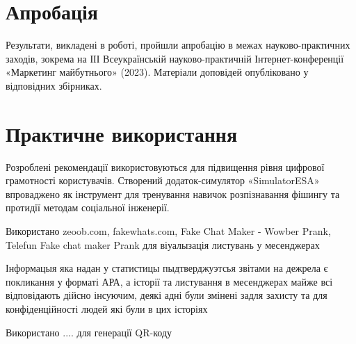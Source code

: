 ﻿\thispagestyle{empty}
\mbox{}

\vspace{1em}

\section*{Апробація}
Результати, викладені в роботі, пройшли апробацію в межах науково-практичних заходів, зокрема на ІІІ Всеукраїнській науково-практичній Інтернет-конференції «Маркетинг майбутнього» (2023). Матеріали доповідей опубліковано у відповідних збірниках.

\section*{Практичне використання}
Розроблені рекомендації використовуються для підвищення рівня цифрової грамотності користувачів. Створений додаток-симулятор «SimulatorESA» впроваджено як інструмент для тренування навичок розпізнавання фішингу та протидії методам соціальної інженерії.

\clearpage

Використано zeoob.com, fakewhats.com, Fake Chat Maker - Wowber Prank, Telefun Fake chat maker Prank для віуалызація листувань у месенджерах

Інформацыя яка надан у статистицы пыдтверджуэтсья звітами на дежрела є покликання у форматі АРА, а історії та листування в месенджерах майже всі відповідають дійсно інсуючим, деякі адні були змінені задля захисту та для конфіденційності людей які були в цих історіях 

Використано .... для генерації QR-коду


\clearpage
